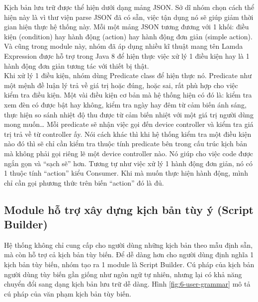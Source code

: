 \documentclass[12pt,a4paper,oneside]{extbook}
\begin{document}
\noindent
Kịch bản lưu trữ được thể hiện dưới dạng mảng JSON. Sở dĩ nhóm chọn cách thể hiện này là vì thư viện parse JSON đã có sẵn, việc tận dụng nó sẽ giúp giảm thời gian hiện thực hệ thống này. Mỗi một mảng JSON tương đương với 1 khối: điều kiện (condition) hay hành động (action) hay hành động đơn giản (simple action). Và cũng trong module này, nhóm đã áp dụng nhiều kĩ thuật mang tên Lamda Expression được hỗ trợ trong Java 8 để hiện thực việc xử lý 1 điều kiện hay là 1 hành động đơn giản tương tác với thiết bị thật.\\

\noindent
Khi xử lý 1 điều kiện, nhóm dùng Predicate class để hiện thực nó. Predicate như một mệnh đề luận lý trả về giá trị hoặc đúng, hoặc sai, rất phù hợp cho việc kiểm tra điều kiện. Một vài điều kiện cơ bản mà hệ thống hiện có đó là: kiểm tra xem đèn có được bật hay không, kiểm tra ngày hay đêm từ cảm biến ánh sáng, thực hiện so sánh nhiệt độ thu được từ cảm biến nhiệt với một giá trị người dùng mong muốn… Mỗi predicate sẽ nhận việc gọi đến device controller và kiểm tra giá trị trả về từ controller ấy. Nói cách khác thì khi hệ thống kiểm tra một điều kiện nào đó thì sẽ chỉ cần kiểm tra thuộc tính predicate bên trong cấu trúc kịch bản mà không phải gọi riêng lẽ một device controller nào. Nó giúp cho việc code được ngắn gọn và “sạch sẽ” hơn. Tương tự như việc xử lý 1 hành động đơn giản, nó có 1 thuộc tính “action” kiểu Consumer. Khi mà muốn thực hiện hành động, mình chỉ cần gọi phương thức trên biến “action” đó là đủ.

\subsection{Module hỗ trợ xây dựng kịch bản tùy ý (Script Builder)}\label{script-builder}

Hệ thống không chỉ cung cấp cho người dùng những kịch bản theo mẫu định sẵn, mà còn hỗ trợ cả kịch bản tùy biến. Để dễ dàng hơn cho người dùng định nghĩa 1 kịch bản tùy biến, nhóm tạo ra 1 module là Script Builder. Cú pháp của kịch bản người dùng tùy biến gần giống như ngôn ngữ tự nhiên, nhưng lại có khả năng chuyển đổi sang dạng kịch bản lưu trữ dễ dàng. Hình \ref{fig:6-user-grammar} mô tả cú pháp của văn phạm kịch bản tùy biến.
\end{document}
